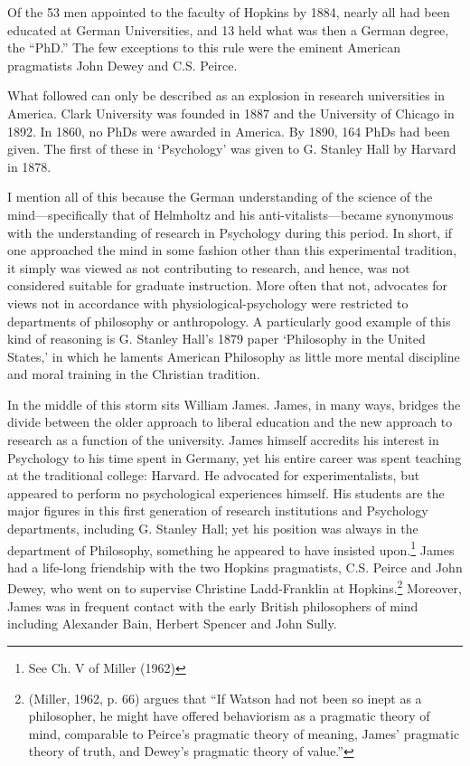 Of the 53 men appointed to the faculty of Hopkins by 1884, nearly all had been educated at German Universities, and 13 held what was then a German degree, the ``PhD.'' The few exceptions to this rule were the eminent American pragmatists John Dewey and C.S. Peirce. 

What followed can only be described as an explosion in research universities in America. Clark University was founded in 1887 and the University of Chicago in 1892. In 1860, no PhDs were awarded in America. By 1890, 164 PhDs had been given. The first of these in `Psychology' was given to G. Stanley Hall by Harvard in 1878.

I mention all of this because the German understanding of the science of the mind---specifically that of Helmholtz and his anti-vitalists---became synonymous with the understanding of research in Psychology during this period. In short, if one approached the mind in some fashion other than this experimental tradition, it simply was viewed as not contributing to research, and hence, was not considered suitable for graduate instruction. More often that not, advocates for views not in accordance with physiological-psychology were restricted to departments of philosophy or anthropology. A particularly good example of this kind of reasoning is G. Stanley Hall's 1879 paper `Philosophy in the United States,' in which he laments American Philosophy as little more mental discipline and moral training in the Christian tradition.

In the middle of this storm sits William James. James, in many ways, bridges the divide between the older approach to liberal education and the new approach to research as a function of the university. James himself accredits his interest in Psychology to his time spent in Germany, yet his entire career was spent teaching at the traditional college: Harvard. He advocated for experimentalists, but appeared to perform no psychological experiences himself. His students are the major figures in this first generation of research institutions and Psychology departments, including G. Stanley Hall; yet his position was always in the department of Philosophy, something he appeared to have insisted upon.\footnote{See Ch. V of Miller (1962)} James had a life-long friendship with the two Hopkins pragmatists, C.S. Peirce and John Dewey, who went on to supervise Christine Ladd-Franklin at Hopkins.\footnote{(Miller, 1962, p. 66) argues that ``If Watson had not been so inept as a philosopher, he might have offered behaviorism as a pragmatic theory of mind, comparable to Peirce's pragmatic theory of meaning, James' pragmatic theory of truth, and Dewey's pragmatic theory of value.''} Moreover, James was in frequent contact with the early British philosophers of mind including Alexander Bain, Herbert Spencer and John Sully. 

